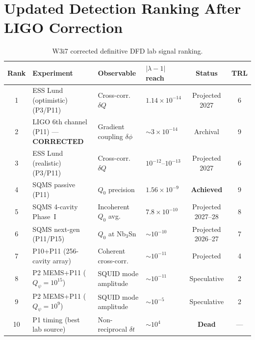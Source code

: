 \documentclass[11pt]{article}
\newcommand{\lam}{\lambda}
\newcommand{\ee}[1]{\times 10^{#1}}
\newcommand{\Qpsi}{Q_\psi}
\newcommand{\lbone}{|\lam - 1|}
\theoremstyle{definition}
\theoremstyle{remark}
\begin{document}
\section{Updated Detection Ranking After LIGO Correction}
\label{sec:updated_ranking}

\begin{table}[H]
\centering
\caption{W3i7 corrected definitive DFD lab signal ranking.}
\label{tab:w3i7_ranking}
\renewcommand{\arraystretch}{1.25}
\begin{tabular}{@{}clllcc@{}}
\toprule
\textbf{Rank} & \textbf{Experiment} & \textbf{Observable} &
  \textbf{$\lbone$ reach} & \textbf{Status} & \textbf{TRL} \\
\midrule
\rowcolor{rowhi}
1 & ESS Lund (optimistic) (P3/P11) & Cross-corr.\ $\delta Q$
  & $1.14\ee{-14}$ & Projected 2027 & 6 \\
\rowcolor{rowhi}
2 & LIGO 6th channel (P11) --- \textbf{CORRECTED} & Gradient coupling
  $\delta\phi$ & $\sim 3\ee{-14}$ & Archival & 9 \\
\rowcolor{rowhi}
3 & ESS Lund (realistic) (P3/P11) & Cross-corr.\ $\delta Q$
  & $10^{-12}$--$10^{-13}$ & Projected 2027 & 6 \\
\rowcolor{rowhi}
4 & SQMS passive (P11) & $Q_0$ precision
  & $1.56\ee{-9}$ & \textbf{Achieved} & 9 \\
\rowcolor{rowmed}
5 & SQMS 4-cavity Phase~I & Incoherent $Q_0$ avg.
  & $7.8\ee{-10}$ & Projected 2027--28 & 8 \\
\rowcolor{rowmed}
6 & SQMS next-gen (P11/P15) & $Q_0$ at Nb$_3$Sn
  & $\sim 10^{-10}$ & Projected 2026--27 & 7 \\
\rowcolor{rowmed}
7 & P10+P11 (256-cavity array) & Coherent cross-corr.
  & $\sim 10^{-11}$ & Projected & 4 \\
\rowcolor{rowlo}
8 & P2 MEMS+P11 ($\Qpsi=10^{15}$) & SQUID mode amplitude
  & $\sim 10^{-11}$ & Speculative & 2 \\
\rowcolor{rowlo}
9 & P2 MEMS+P11 ($\Qpsi=10^{9}$) & SQUID mode amplitude
  & $\sim 10^{-5}$ & Speculative & 2 \\
\rowcolor{rowlo}
10 & P1 timing (best lab source) & Non-reciprocal $\delta t$
  & $\sim 10^{4}$ & \textbf{Dead} & --- \\
\bottomrule
\end{tabular}
\end{table}
\end{document}
